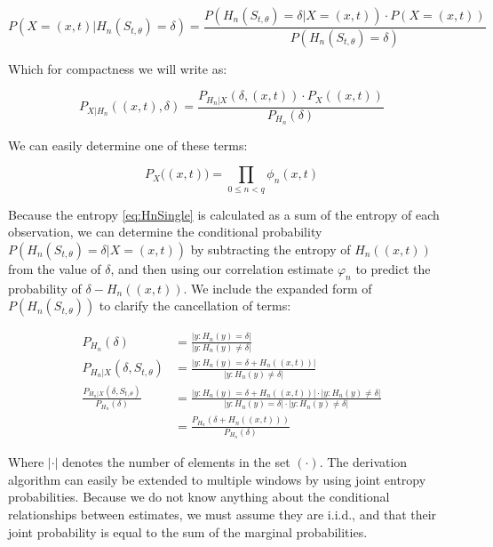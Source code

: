 \documentclass[10pt]{article}
\begin{document}
\[ P \left( X = (x,t) | H_n(S_{t,\theta}) = \delta \right) = \frac { P \left( H_n( S_{t,\theta} ) = \delta | X = (x,t) \right) \cdot P \left( X = (x,t) \right) } { P \left( H_n( S_{t,\theta} ) = \delta \right) } \]

Which for compactness we will write as:

\begin{equation} P_{X|H_n} \left( (x,t), \delta \right) = \frac { P_{H_n|X} \left( \delta, (x,t) \right) \cdot P_X \left( (x,t) \right) } { P_{H_n} \left( \delta \right) } \end{equation}

We can easily determine one of these terms:

\begin{equation} P_X \big( (x,t) \big) = \prod_{0 \le n < q} \phi_n(x,t) \end{equation}

Because the entropy \ref{eq:HnSingle} is calculated as a sum of the entropy of each observation, we can determine the conditional probability \( P \left( H_n(S_{t,\theta}) = \delta | X = (x,t) \right) \) by subtracting the entropy of \(H_n((x,t)) \) from the value of \(\delta \), and then using our correlation estimate \(\varphi_n \) to predict the probability of \(\delta - H_n((x,t)) \).  We include the expanded form of \(P( H_n(S_{t,\theta}) ) \) to clarify the cancellation of terms:

\begin{align*}
P_{H_n} \left( \delta \right) &= \frac{ | y : H_n(y) = \delta | }{ | y : H_n(y) \ne \delta | } \\
P_{H_n |X} \left( \delta, S_{t,\theta} \right) &= \frac{ | y : H_n(y) = \delta + H_n \left( (x,t) \right) | }{ | y : H_n (y) \ne \delta | } \\
\frac{ P_{H_n |X} \left( \delta, S_{t,\theta} \right) }{ P_{H_n}( \delta ) } &= \frac{ | y : H_n(y) = \delta + H_n \left( (x,t) \right) | \cdot | y : H_n(y) \ne \delta | }
{ | y : H_n(y) = \delta | \cdot | y : H_n(y) \ne \delta | } \\
&= \frac{ P_{H_n} \left( \delta + H_n \left( (x,t) \right) \right) }{ P_{H_n} \left( \delta \right) } 
\end{align*}

Where \( | \cdot | \) denotes the number of elements in the set \( (\cdot) \).  The derivation algorithm can easily be extended to multiple windows by using joint entropy probabilities.  Because we do not know anything about the conditional relationships between estimates, we must assume they are i.i.d., and that their joint probability is equal to the sum of the marginal probabilities.
\end{document}
